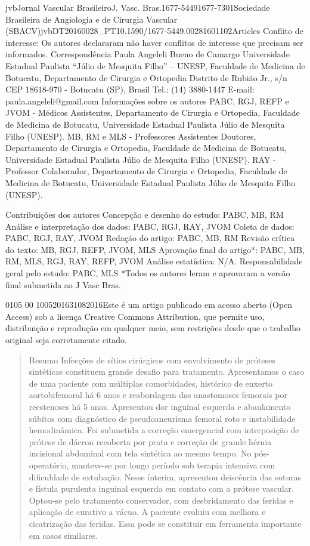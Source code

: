 \documentclass[numberinsection,times,10pt,spreadimages]{memoir}
\begin{document}
jvbJornal Vascular BrasileiroJ. Vasc. Bras.1677-54491677-7301Sociedade
Brasileira de Angiologia e de Cirurgia Vascular
(SBACV)jvbDT20160028\_{}PT10.1590/1677-5449.00281601102Articles
Conflito de interesse: Os autores declararam não haver conflitos de interesse
que precisam ser informados.
\label{*}
Correspondência Paula Angeleli Bueno de Camargo Universidade
Estadual Paulista “Júlio de Mesquita Filho” – UNESP, Faculdade de Medicina de
Botucatu, Departamento de Cirurgia e Ortopedia Distrito de Rubião Jr., s/n CEP
18618-970 - Botucatu (SP), Brasil Tel.: (14) 3880-1447 E-mail:
paula.angeleli@gmail.com
Informações sobre os autores PABC, RGJ, REFP e JVOM - Médicos Assistentes,
Departamento de Cirurgia e Ortopedia, Faculdade de Medicina de Botucatu,
Universidade Estadual Paulista Júlio de Mesquita Filho (UNESP). MB, RM e MLS
- Professores Assistentes Doutores, Departamento de Cirurgia e Ortopedia,
Faculdade de Medicina de Botucatu, Universidade Estadual Paulista Júlio de
Mesquita Filho (UNESP). RAY - Professor Colaborador, Departamento de
Cirurgia e Ortopedia, Faculdade de Medicina de Botucatu, Universidade
Estadual Paulista Júlio de Mesquita Filho (UNESP).

Contribuições dos autores Concepção e desenho do estudo: PABC, MB, RM Análise
e interpretação dos dados: PABC, RGJ, RAY, JVOM Coleta de dados: PABC, RGJ,
RAY, JVOM Redação do artigo: PABC, MB, RM Revisão crítica do texto: MB, RGJ,
REFP, JVOM, MLS Aprovação final do artigo*: PABC, MB, RM, MLS, RGJ, RAY,
REFP, JVOM Análise estatística: N/A. Responsabilidade geral pelo estudo:
PABC, MLS *Todos os autores leram e aprovaram a versão final submetida ao J
Vasc Bras.
\date{2017}{01}{05}
\newcommand{\volume}{00}
00\newcommand{\fpage}{000}
\newcommand{\lpage}{000}
1005201631082016Este é um artigo publicado em acesso aberto (Open
Access) sob a licença Creative Commons
Attribution, que permite uso, distribuição e reprodução em
qualquer meio, sem restrições desde que o trabalho original seja
corretamente citado.

\begin{abstract}
Resumo Infecções de sítios cirúrgicos com envolvimento de próteses sintéticas
constituem grande desafio para tratamento. Apresentamos o caso de uma
paciente com múltiplas comorbidades, histórico de enxerto aortobifemoral há 6
anos e reabordagem das anastomoses femorais por reestenoses há 5
anos. Apresentou dor inguinal esquerda e abaulamento súbitos com diagnóstico
de pseudoaneurisma femoral roto e instabilidade hemodinâmica. Foi submetida a
correção emergencial com interposição de prótese de dácron recoberta por
prata e correção de grande hérnia incisional abdominal com tela sintética ao
mesmo tempo. No pós-operatório, manteve-se por longo período sob terapia
intensiva com dificuldade de extubação. Nesse ínterim, apresentou deiscência
das suturas e fístula purulenta inguinal esquerda em contato com a prótese
vascular. Optou-se pelo tratamento conservador, com desbridamento das feridas
e aplicação de curativo a vácuo. A paciente evoluiu com melhora e
cicatrização das feridas.  Essa pode se constituir em ferramenta importante
em casos similares.
\end{abstract}
\end{document}

